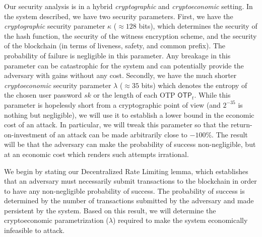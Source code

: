 Our security analysis is in a hybrid \emph{cryptographic} and \emph{cryptoeconomic}
setting.
In the system described, we have two security parameters. First, we have
the \emph{cryptographic} security
parameter $\kappa$ ($\approx 128$ bits), which determines the security of the hash function,
the security of the witness encryption scheme, and the security of the blockchain (in terms
of liveness, safety, and common prefix). The probability of failure is negligible in this
parameter. Any breakage in this parameter can be catastrophic for the system and
can potentially provide the adversary with gains without any cost.
Secondly, we have the much shorter \emph{cryptoeconomic} security parameter $\lambda$
($\approx 35$ bits) which denotes the entropy of the chosen user password $sk$ or the
length of each OTP $\textsf{OTP}_t$.
While this parameter is hopelessly short from a cryptographic
point of view (and $2^{-35}$ is nothing but negligible), we will use it to establish
a lower bound in the economic cost of an attack. In particular, we will tweak this
parameter so that the return-on-investment of an attack can be made arbitrarily close
to $-100\%$. The result will be that the adversary can make the probability of
success non-negligible, but at an economic cost which renders such attempts irrational.

We begin by stating our Decentralized Rate Limiting lemma, which establishes that
an adversary must necessarily submit transactions to the blockchain in order to
have any non-negligible probability of success. The probability of success is
determined by the number of transactions submitted by the adversary and made
persistent by the system. Based on this result, we will determine the cryptoeconomic
parametrization ($\lambda$) required to make the system economically infeasible to attack.

